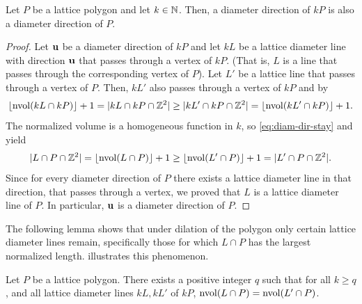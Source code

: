 \begin{lemma}\label{lemma:same-dir}
    Let $P$ be a lattice polygon and let $k \in \mathbb{N}$. Then, a diameter direction of $kP$ is also a diameter direction of $P$.
\end{lemma}
\begin{proof}
    Let $\mathbf{u}$ be a diameter direction of $kP$ and let $kL$ be a lattice diameter line with direction $\mathbf{u}$ that passes through a vertex of $kP$. (That is, $L$ is a line that passes through the corresponding vertex of $P$). Let $L'$ be a lattice line that passes through a vertex of $P$. Then, $kL'$ also passes through a vertex of $kP$ and by 
    \begin{align}\label{eq:diam-dir-stay}
        \lfloor \operatorname{nvol}(kL \cap kP) \rfloor +1 = |kL \cap kP \cap \mathbb{Z}^2|  \geq |kL' \cap kP \cap \mathbb{Z}^2| = \lfloor \operatorname{nvol}(kL' \cap kP) \rfloor +1.
    \end{align}
    The normalized volume is a homogeneous function in $k$, so \eqref{eq:diam-dir-stay} and  yield
    \begin{align*}
        |L \cap P \cap \mathbb{Z}^2|  = \lfloor \operatorname{nvol}(L \cap P) \rfloor +1 \geq \lfloor \operatorname{nvol}(L' \cap P) \rfloor +1 =|L' \cap P \cap \mathbb{Z}^2|.
    \end{align*}
    Since for every diameter direction of $P$ there exists a lattice diameter line in that direction, that passes through a vertex, we proved that $L$ is a lattice diameter line of $P$. In particular, $\mathbf{u}$ is a diameter direction of $P$.
\end{proof}

The following lemma shows that under dilation of the polygon only certain lattice diameter lines remain, specifically those for which $L \cap P$ has the largest normalized length.  illustrates this phenomenon.



\begin{lemma}\label{lemma:same-nvol}
    Let $P$ be a lattice polygon. There exists a positive integer $q$ such that for all $k\geq q$, and all lattice diameter lines $kL,kL'$ of $kP$, $\operatorname{nvol}(L \cap P)=\operatorname{nvol}(L' \cap P)$.
\end{lemma}

